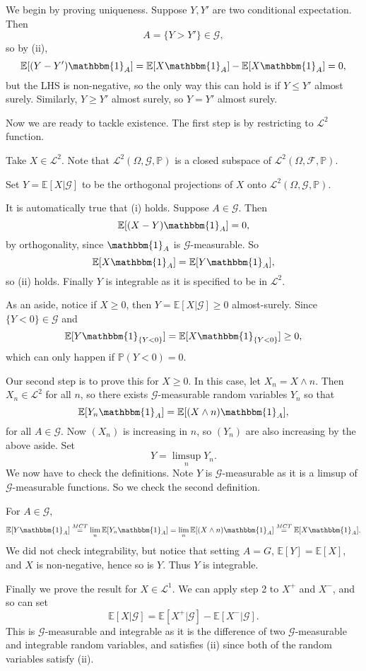 \documentclass[12pt]{article}
\begin{document}
\begin{proofbox}
	We begin by proving uniqueness. Suppose $Y, Y'$ are two conditional expectation. Then
	\[
		A = \{Y > Y'\} \in \mathcal{G},
	\]
	so by (ii),
	\[
	\mathbb{E}[(Y - Y') \mathbbm{1}_{A}] = \mathbb{E}[X \mathbbm{1}_{A}] - \mathbb{E}[X \mathbbm{1}_{A}] = 0,
	\]
	but the LHS is non-negative, so the only way this can hold is if $Y \leq Y'$ almost surely. Similarly, $Y \geq Y'$ almost surely, so $Y = Y'$ almost surely.

	Now we are ready to tackle existence. The first step is by restricting to $\mathcal{L}^2$ function.

	Take $X \in \mathcal{L}^2$. Note that $\mathcal{L}^2(\Omega, \mathcal{G}, \mathbb{P})$ is a closed subspace of $\mathcal{L}^2(\Omega, \mathcal{F}, \mathbb{P})$.

	Set $Y = \mathbb{E}[X | \mathcal{G}]$ to be the orthogonal projections of $X$ onto $\mathcal{L}^2(\Omega, \mathcal{G}, \mathbb{P})$.

	It is automatically true that (i) holds. Suppose $A \in \mathcal{G}$. Then
	\[
	\mathbb{E}[(X - Y) \mathbbm{1}_{A}] = 0,
	\]
	by orthogonality, since $\mathbbm{1}_{A}$ is $\mathcal{G}$-measurable. So
	\[
	\mathbb{E}[X \mathbbm{1}_{A}] = \mathbb{E}[Y \mathbbm{1}_{A}],
	\]
	so (ii) holds. Finally $Y$ is integrable as it is specified to be in $\mathcal{L}^2$.


	As an aside, notice if $X \geq 0$, then $Y = \mathbb{E}[X | \mathcal{G}] \geq 0$ almost-surely. Since $\{Y < 0\} \in \mathcal{G}$ and
	\[
		\mathbb{E}[Y \mathbbm{1}_{\{Y < 0\}}] = \mathbb{E}[X \mathbbm{1}_{\{Y < 0\}}] \geq 0,
	\]
	which can only happen if $\mathbb{P}(Y < 0) = 0$.

	Our second step is to prove this for $X \geq 0$. In this case, let $X_n = X \wedge n$. Then $X_n \in \mathcal{L}^2$ for all $n$, so there exists $\mathcal{G}$-measurable random variables $Y_n$ so that
	\[
	\mathbb{E}[Y_n \mathbbm{1}_{A}] = \mathbb{E}[(X \wedge n) \mathbbm{1}_{A}],
	\]
	for all $A \in \mathcal{G}$. Now $(X_n)$ is increasing in $n$, so $(Y_n)$ are also increasing by the above aside. Set
	\[
	Y = \limsup_{n} Y_n.
	\]
	We now have to check the definitions. Note $Y$ is $\mathcal{G}$-measurable as it is a limsup of $\mathcal{G}$-measurable functions. So we check the second definition.

	For $A \in \mathcal{G}$,
	\[
		\mathbb{E}[Y \mathbbm{1}_{A}] \overset{MCT}= \lim_n \mathbb{E}[Y_n \mathbbm{1}_{A}] = \lim_n \mathbb{E}[(X \wedge n) \mathbbm{1}_{A}] \overset{MCT}= \mathbb{E}[X \mathbbm{1}_{A}].
	\]
	We did not check integrability, but notice that setting $A = G$, $\mathbb{E}[Y] = \mathbb{E}[X]$, and $X$ is non-negative, hence so is $Y$. Thus $Y$ is integrable.

	Finally we prove the result for $X \in \mathcal{L}^1$. We can apply step 2 to $X^+$ and $X^-$, and so can set
	\[
	\mathbb{E}[X|\mathcal{G}] = \mathbb{E}[X^+|\mathcal{G}] - \mathbb{E}[X^-|\mathcal{G}].
	\]
	This is $\mathcal{G}$-measurable and integrable as it is the difference of two $\mathcal{G}$-measurable and integrable random variables, and satisfies (ii) since both of the random variables satisfy (ii).
\end{proofbox}
\end{document}
